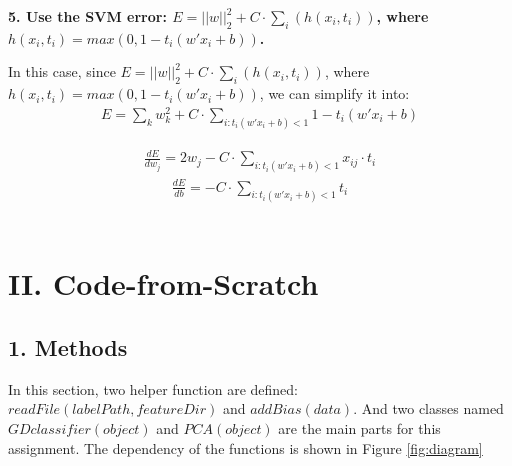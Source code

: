 \begin{description}
\item{\bf \large 5. Use the SVM error: $E = ||w||^2_2 + C \cdot \sum_i{(h(x_i, t_i))}$, where 
	  $h(x_i, t_i) = max(0, 1 - t_i (w' x_i + b))$.}
	  
In this case, since $E = ||w||^2_2 + C \cdot \sum_i{(h(x_i, t_i))}$, 
where $h(x_i, t_i) = max(0, 1 - t_i (w' x_i + b))$, we can simplify it into:
\begin{equation}
\begin{split}
	E = \sum_k{w_k^2} + C \cdot \sum_{i: t_i(w' x_i + b) < 1}{1 - t_i(w' x_i + b)}
\end{split}
\end{equation}

\begin{equation}
\begin{split}
	\frac{dE}{dw_j} = 2w_j - C \cdot \sum_{i: t_i(w' x_i + b) < 1}{x_{ij} \cdot t_i}
\end{split}
\end{equation}
\begin{equation}
\begin{split}
	\frac{dE}{db} = - C \cdot \sum_{i: t_i(w' x_i + b) < 1}{t_i}
\end{split}
\end{equation}\\
\end{description}


\newpage
\section*{\Large II. Code-from-Scratch}

\subsection*{\large 1. Methods}
In this section, two helper function are defined: $readFile(labelPath, featureDir)$ and $addBias(data)$. And two classes named $GDclassifier(object)$ and $PCA(object)$ are the main parts for this assignment. The dependency of the functions is shown in Figure \ref{fig:diagram}

